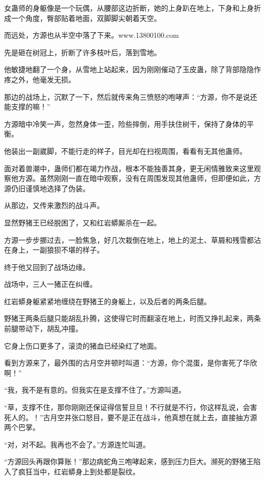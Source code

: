 
\begin{this_body}

女蛊师的身躯像是一个玩偶，从腰部这边折断，她的上身趴在地上，下身和上身折成一个角度，臀部贴着地面，双脚脚尖朝着天空。

而远处，方源也从半空中落了下来。www.13800100.com

先是砸在树冠上，折断了许多枝叶后，落到雪地。

他敏捷地翻了一个身，从雪地上站起来，因为刚刚催动了玉皮蛊，除了背部隐隐作疼之外，他毫发无损。

那边的战场上，沉默了一下，然后就传来角三愤怒的咆哮声：“方源，你不是说还能支撑的嘛！”

方源暗中冷笑一声，忽然身体一歪，险些摔倒，用手扶住树干，保持了身体的平衡。

他装出一副崴脚，不能行走的样子，目光却在扫视周围，看看有无其他蛊师。

面对着兽潮中，蛊师们都在竭力作战，根本不能独善其身，更无闲情雅致来这里观察他方源。虽然刚刚一直在暗中观察，没有在周围发现其他蛊师，但即便如此，方源仍旧谨慎地选择了伪装。

从那边，又传来激烈的战斗声。

显然野猪王已经脱困了，又和红岩蟒厮杀在一起。

方源一步步挪过去，一脸焦急，好几次栽倒在地上，地上的泥土、草屑和残雪都沾在身上，一副狼狈不堪的样子。

终于他又回到了战场边缘。

战场中，三人一猪正在纠缠。

红岩蟒身躯紧紧地缠绕在野猪王的身躯上，以及后者的两条后腿。

野猪王两条后腿只能胡乱扑腾，这使得它时而翻滚在地上，时而又挣扎起来，两条前腿带动下，胡乱冲撞。

它身上伤口更多了，滚烫的猪血已经染红了地面。

看到方源来了，最外围的古月空井顿时叫道：“方源，你个混蛋，是你害死了华欣啊！”

“我，我不是有意的。但我实在是支撑不住了。”方源叫道。

“草，支撑不住，那你刚刚还保证得信誓旦旦！不行就是不行，你这样乱说，会害死人的。！”古月空井张口怒目，要不是正在战斗，他真想在就上去，直接抽方源两个巴掌。

“对，对不起。我再也不会了。”方源连忙叫道。

“方源回头再跟你算账！”那边病蛇角三咆哮起来，感到压力巨大。濒死的野猪王陷入了疯狂当中，红岩蟒身上到处都是裂纹。


\end{this_body}
